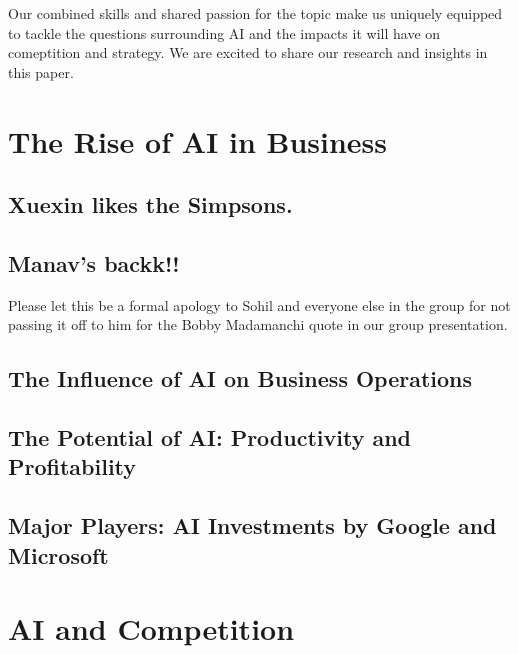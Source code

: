 \documentclass[
]{book}
\begin{document}
Our combined skills and shared passion for the topic make us uniquely equipped to tackle the questions surrounding AI and the impacts it will have on comeptition and strategy. We are excited to share our research and insights in this paper.

\hypertarget{the-rise-of-ai-in-business}{%
\chapter{The Rise of AI in Business}\label{the-rise-of-ai-in-business}}

\hypertarget{xuexin-likes-the-simpsons.}{%
\section{Xuexin likes the Simpsons.}\label{xuexin-likes-the-simpsons.}}

\hypertarget{manavs-backk}{%
\section{Manav's backk!!}\label{manavs-backk}}

Please let this be a formal apology to Sohil and everyone else in the group for not passing it off to him for the Bobby Madamanchi quote in our group presentation.

\hypertarget{the-influence-of-ai-on-business-operations}{%
\section{The Influence of AI on Business Operations}\label{the-influence-of-ai-on-business-operations}}

\hypertarget{the-potential-of-ai-productivity-and-profitability}{%
\section{The Potential of AI: Productivity and Profitability}\label{the-potential-of-ai-productivity-and-profitability}}

\hypertarget{major-players-ai-investments-by-google-and-microsoft}{%
\section{Major Players: AI Investments by Google and Microsoft}\label{major-players-ai-investments-by-google-and-microsoft}}

\hypertarget{ai-and-competition}{%
\chapter{AI and Competition}\label{ai-and-competition}}
\end{document}
